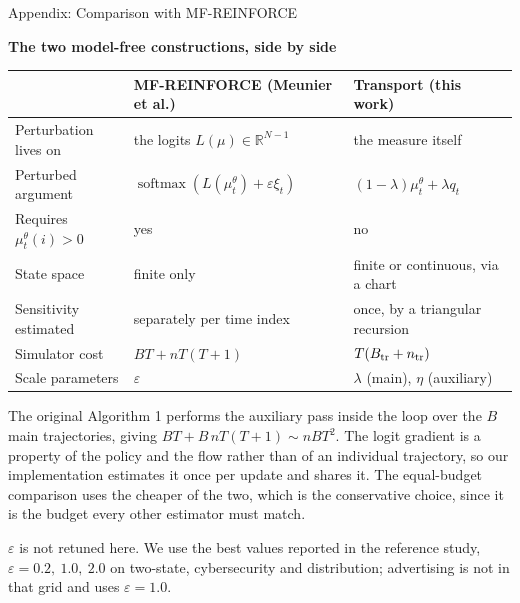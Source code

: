 \documentclass[9pt]{beamer}
\def\R{{\mathbb R}}
\newcommand{\exhibittitle}[1]{%
  \begin{center}{\small\bfseries\color{Xblue}#1}\end{center}%
  \vspace{-0.28cm}}
\newenvironment{exhibit}[1]{%
  \exhibittitle{#1}%
  \par\vspace{0.05cm}\begin{center}}%
  {\end{center}\vspace{-0.15cm}}
\begin{document}
\begin{frame}{Appendix: Comparison with MF-REINFORCE}
\footnotesize
\begin{exhibit}{The two model-free constructions, side by side}
\begin{tabular}{lll}
\toprule
 & MF-REINFORCE (Meunier et al.) & Transport (this work) \\
\midrule
Perturbation lives on & the logits $L(\mu)\in\R^{N-1}$ & the measure itself \\
Perturbed argument & $\operatorname{softmax}(L(\mu_t^\theta)+\varepsilon\xi_t)$ & $(1-\lambda)\mu_t^\theta+\lambda q_t$ \\
Requires $\mu_t^\theta(i)>0$ & yes & no \\
State space & finite only & finite or continuous, via a chart \\
Sensitivity estimated & separately per time index & once, by a triangular recursion \\
Simulator cost & $BT+nT(T+1)$ & $T(B_{\rm tr}+n_{\rm tr})$ \\
Scale parameters & $\varepsilon$ & $\lambda$ (main), $\eta$ (auxiliary) \\
\bottomrule
\end{tabular}
\end{exhibit}

\vspace{0.15cm}
\small
The original Algorithm 1 performs the auxiliary pass inside the loop over the $B$ main trajectories, giving $BT+B\,nT(T+1)\sim nBT^2$. The logit gradient is a property of the policy and the flow rather than of an individual trajectory, so our implementation estimates it once per update and shares it. The equal-budget comparison uses the cheaper of the two, which is the conservative choice, since it is the budget every other estimator must match.

\vspace{0.1cm}
$\varepsilon$ is not retuned here. We use the best values reported in the reference study, $\varepsilon=0.2,\ 1.0,\ 2.0$ on two-state, cybersecurity and distribution; advertising is not in that grid and uses $\varepsilon=1.0$.
\end{frame}

\end{document}
